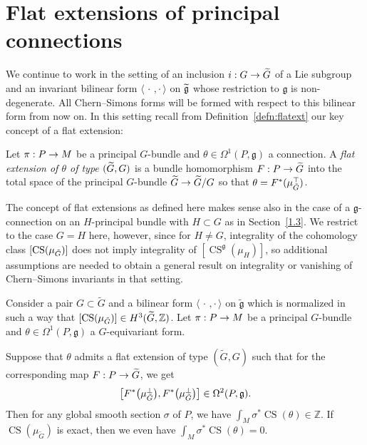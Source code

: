 \documentclass[AHL,Unicode,longabstracts]{cedram}
\renewcommand{\th}{\theta}
\newcommand{\si}{\sigma}
\newcommand{\Om}{\Omega}
\newcommand{\B}[2]{\langle#1,#2\rangle}
\DeclareMathOperator{\CS}{CS}
\newcommand{\Z}{\mathbb{Z}}
\newcommand{\tfg}{\widetilde{\mathfrak g}}
\newcommand{\fkg}{\mathfrak{g}}
\renewcommand*{\to}{\mathchoice{\longrightarrow}{\rightarrow}{\rightarrow}{\rightarrow}}
\let\originalleft\left
\let\originalright\right
\renewcommand{\left}{\mathopen{}\mathclose\bgroup\originalleft}
\renewcommand{\right}{\aftergroup\egroup\originalright}
\let\oldtilde\tilde
\renewcommand*{\tilde}[1]{\mathchoice{\widetilde{#1}}{\widetilde{#1}}{\oldtilde{#1}}{\oldtilde{#1}}}
\begin{document}
\section{Flat extensions of principal connections}\label{sect:flatextensionGequlasH}

We continue to work in the setting of an inclusion $i: G\to\tilde G$ of a Lie subgroup and an invariant bilinear form $\B{\,\cdot\,}{\cdot\,}$ on $\tilde{\fkg}$ whose restriction to $\fkg$ is non-degenerate. All Chern--Simons forms will be formed with respect to this bilinear form from now on. In this setting recall from Definition~\ref{defn:flatext} our key concept of a flat extension:

\begin{defi}\label{def:flat-ext}
Let $\pi : P \to M$ be a principal $G$-bundle and $\theta \in \Omega^1(P,\fkg)$ a connection. A \emph{flat extension of $\theta$ of type $(\tilde{G},G)$} is a bundle homomorphism $F : P \to \tilde{G}$ into the total space of the principal $G$-bundle $\tilde{G} \to \tilde{G}/G$ so that $\theta=F^*(\mu_{\tilde{G}}^{\top})$.
\end{defi}

\begin{rema}\label{rem:flat-ext}
The concept of flat extensions as defined here makes sense also in the case of a $\fkg$-connection on an $H$-principal bundle with $H\subset G$ as in Section~\ref{1.3}. We restrict to the case $G=H$ here, however, since for $H\neq G$, integrality of the cohomology class $[\CS(\mu_{\tilde G})]$ does not imply integrality of $[\CS^\fkg(\mu_H)]$, so additional assumptions are needed to obtain a general result on integrality or vanishing of Chern--Simons invariants in that setting.
\end{rema}

\begin{theo}\label{thm:main-flat}
Consider a pair $G\subset\widetilde{G}$ and a bilinear form $\B{\,\cdot\,}{\cdot\,}$ on $\tfg$ which is normalized in such a way that $[\CS(\mu_{\tilde G})]\in H^3(\tilde G,\Z)$. Let $\pi: P\to M$ be a principal $G$-bundle and $\theta\in\Om^1(P,\fkg)$ a $G$-equivariant form.

Suppose that $\th$ admits a flat extension of type $(\widetilde{G},G)$ such that for the corresponding map $F:P\to\tilde G$, we get
\begin{equation}\label{cond:flatextcond}
\left[F^*\left(\mu_{\tilde G}^\perp\right),F^*\left(\mu_{\tilde G}^\perp\right)\right]\in\Om^2(P,\fkg).
\end{equation}
Then for any global smooth section $\si$ of $P$, we have $\int_M\si^*\CS(\theta)\in \Z$. If $\CS(\mu_{\widetilde{G}})$ is exact, then we even have $\int_M\si^*\CS(\theta)=0$.
\end{theo}
\end{document}
